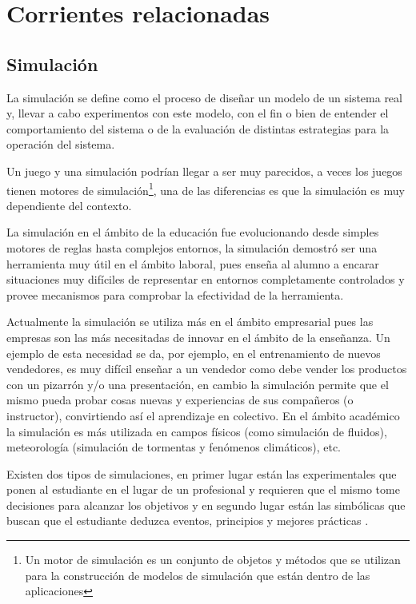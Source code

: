 \section{Corrientes relacionadas}

\subsection{Simulación}

La simulación se define como el proceso de diseñar un modelo de un sistema real
y, llevar a cabo experimentos con este modelo, con el fin o bien de entender el
comportamiento del sistema o de la evaluación de distintas estrategias para la
operación del sistema\cite{ingalls2008introduction}. 

Un juego y una simulación podrían llegar a ser muy parecidos, a veces los juegos
tienen motores de simulación\footnote{Un motor de simulación es un conjunto de
objetos y métodos que se utilizan para la construcción de modelos de
simulación que están dentro de las aplicaciones}, una de las diferencias
es que la simulación es muy dependiente del contexto. 

La simulación en el ámbito de la educación fue evolucionando desde simples
motores de reglas hasta complejos entornos, la simulación demostró ser una
herramienta muy útil en el ámbito laboral\cite{mariluz:seiousgames}, pues enseña
al alumno a encarar situaciones muy difíciles de representar en entornos
completamente controlados y provee mecanismos para comprobar la efectividad de
la herramienta. 

Actualmente la simulación se utiliza más en el ámbito empresarial pues las
empresas son las más necesitadas de innovar en el ámbito de la enseñanza. Un
ejemplo de esta necesidad se da, por ejemplo, en el entrenamiento de nuevos
vendedores, es muy difícil enseñar a un vendedor como debe vender los productos
con un pizarrón y/o una presentación, en cambio la simulación permite que el
mismo pueda probar cosas nuevas y experiencias de sus compañeros (o instructor),
convirtiendo así el aprendizaje en colectivo\cite{mariluz:seiousgames}. En el
ámbito académico la simulación es más utilizada en campos físicos (como simulación
de fluidos), meteorología (simulación de tormentas y fenómenos climáticos), etc. 

Existen dos tipos de simulaciones, en primer lugar están las experimentales que
ponen al estudiante en el lugar de un profesional y requieren que el mismo tome
decisiones para alcanzar los objetivos y en segundo lugar están las simbólicas
que buscan que el estudiante deduzca eventos, principios y mejores prácticas
\cite{charsky:2010}. 


